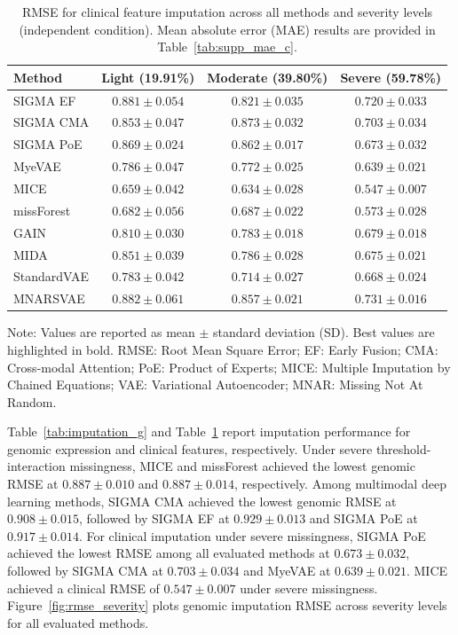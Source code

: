 \documentclass[final,3p,times,authoryear]{elsarticle}
\begin{document}
\begin{table}[!t]
\centering
{}
\caption{RMSE for clinical feature imputation across all methods and severity levels (independent condition). Mean absolute error (MAE) results are provided in Table~\ref{tab:supp_mae_c}.}
\label{tab:imputation_c}
\begin{tabular}{lccc}
\toprule
Method & Light (19.91\%) & Moderate (39.80\%) & Severe (59.78\%) \\
\midrule
SIGMA EF & $0.881 \pm 0.054$ & $0.821 \pm 0.035$ & $0.720 \pm 0.033$ \\
SIGMA CMA & $0.853 \pm 0.047$ & $0.873 \pm 0.032$ & $0.703 \pm 0.034$ \\
SIGMA PoE & $0.869 \pm 0.024$ & $0.862 \pm 0.017$ & $0.673 \pm 0.032$ \\
MyeVAE & $0.786 \pm 0.047$ & $0.772 \pm 0.025$ & $0.639 \pm 0.021$ \\
MICE & $\mathbf{0.659 \pm 0.042}$ & $\mathbf{0.634 \pm 0.028}$ & $\mathbf{0.547 \pm 0.007}$ \\
missForest & $0.682 \pm 0.056$ & $0.687 \pm 0.022$ & $0.573 \pm 0.028$ \\
GAIN & $0.810 \pm 0.030$ & $0.783 \pm 0.018$ & $0.679 \pm 0.018$ \\
MIDA & $0.851 \pm 0.039$ & $0.786 \pm 0.028$ & $0.675 \pm 0.021$ \\
StandardVAE & $0.783 \pm 0.042$ & $0.714 \pm 0.027$ & $0.668 \pm 0.024$ \\
MNARSVAE & $0.882 \pm 0.061$ & $0.857 \pm 0.021$ & $0.731 \pm 0.016$ \\
\bottomrule
\end{tabular}

\vspace{1ex}
\footnotesize{Note: Values are reported as mean $\pm$ standard deviation (SD). Best values are highlighted in bold. RMSE: Root Mean Square Error; EF: Early Fusion; CMA: Cross-modal Attention; PoE: Product of Experts; MICE: Multiple Imputation by Chained Equations; VAE: Variational Autoencoder; MNAR: Missing Not At Random.}
\end{table}

Table~\ref{tab:imputation_g} and Table~\ref{tab:imputation_c} report imputation performance for genomic expression and clinical features, respectively. Under severe threshold-interaction missingness, MICE and missForest achieved the lowest genomic RMSE at $0.887 \pm 0.010$ and $0.887 \pm 0.014$, respectively. Among multimodal deep learning methods, SIGMA CMA achieved the lowest genomic RMSE at $0.908 \pm 0.015$, followed by SIGMA EF at $0.929 \pm 0.013$ and SIGMA PoE at $0.917 \pm 0.014$. For clinical imputation under severe missingness, SIGMA PoE achieved the lowest RMSE among all evaluated methods at $0.673 \pm 0.032$, followed by SIGMA CMA at $0.703 \pm 0.034$ and MyeVAE at $0.639 \pm 0.021$. MICE achieved a clinical RMSE of $0.547 \pm 0.007$ under severe missingness. Figure~\ref{fig:rmse_severity} plots genomic imputation RMSE across severity levels for all evaluated methods.
\end{document}
